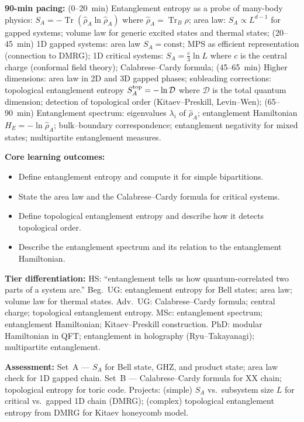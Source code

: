 \documentclass[11pt,a4paper]{article}
\begin{document}
\medskip

\begin{tcolorbox}[modulebox, title={Module~II.7 --- Lecture L11: Entanglement in Many-Body Systems}]
\textbf{90-min pacing:} (0--20~min) Entanglement entropy as a probe of many-body physics: $S_A=-\operatorname{Tr}(\hat\rho_A\ln\hat\rho_A)$ where $\hat\rho_A=\operatorname{Tr}_B\hat\rho$; area law: $S_A\propto L^{d-1}$ for gapped systems; volume law for generic excited states and thermal states; (20--45~min) 1D gapped systems: area law $S_A=\mathrm{const}$; MPS as efficient representation (connection to DMRG); 1D critical systems: $S_A=\tfrac{c}{3}\ln L$ where $c$ is the central charge (conformal field theory); Calabrese--Cardy formula; (45--65~min) Higher dimensions: area law in 2D and 3D gapped phases; subleading corrections: topological entanglement entropy $S_A^{\rm top}=-\ln\mathcal{D}$ where $\mathcal{D}$ is the total quantum dimension; detection of topological order (Kitaev--Preskill, Levin--Wen); (65--90~min) Entanglement spectrum: eigenvalues $\lambda_i$ of $\hat\rho_A$; entanglement Hamiltonian $H_E=-\ln\hat\rho_A$; bulk--boundary correspondence; entanglement negativity for mixed states; multipartite entanglement measures.

\medskip\textbf{Core learning outcomes:}
\begin{itemize}[leftmargin=1.4em,topsep=2pt,itemsep=1pt]
  \item Define entanglement entropy and compute it for simple bipartitions.
  \item State the area law and the Calabrese--Cardy formula for critical systems.
  \item Define topological entanglement entropy and describe how it detects topological order.
  \item Describe the entanglement spectrum and its relation to the entanglement Hamiltonian.
\end{itemize}

\medskip\textbf{Tier differentiation:}
HS: ``entanglement tells us how quantum-correlated two parts of a system are.''
Beg.\ UG: entanglement entropy for Bell states; area law; volume law for thermal states.
Adv.\ UG: Calabrese--Cardy formula; central charge; topological entanglement entropy.
MSc: entanglement spectrum; entanglement Hamiltonian; Kitaev--Preskill construction.
PhD: modular Hamiltonian in QFT; entanglement in holography (Ryu--Takayanagi); multipartite entanglement.

\medskip\textbf{Assessment:}
Set~A --- $S_A$ for Bell state, GHZ, and product state; area law check for 1D gapped chain.
Set~B --- Calabrese--Cardy formula for XX chain; topological entropy for toric code.
Projects: (simple) $S_A$ vs.\ subsystem size $L$ for critical vs.\ gapped 1D chain (DMRG);
(complex) topological entanglement entropy from DMRG for Kitaev honeycomb model.
\end{tcolorbox}
\end{document}
